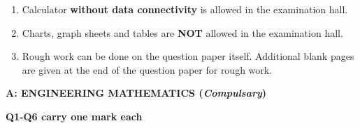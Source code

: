 \documentclass[12pt]{article}
\begin{document}
\begin{enumerate}[start=11,label=\arabic*.]
    \item Calculator \textbf{without data connectivity} is allowed in the examination hall.

    \item Charts, graph sheets and tables are \textbf{NOT} allowed in the examination hall.

    \item Rough work can be done on the question paper itself. Additional blank pages are given at the end of the question paper for rough work.
\end{enumerate}

\newpage



\begin{center}

   \textbf{\large A: ENGINEERING MATHEMATICS (\textit {Compulsary})} \\[1em]
    
\end{center}
\textbf{Q1-Q6 carry one mark each}
\end{document}
